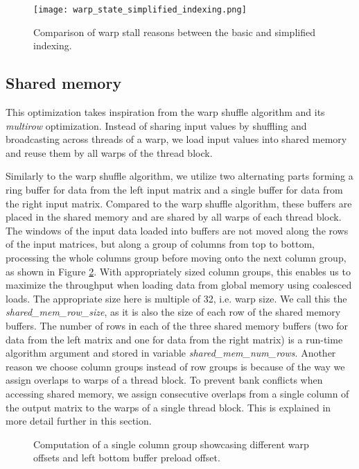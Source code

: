 \begin{figure}[ht]
	\centering
	\texttt{[image: warp\_state\_simplified\_indexing.png]}
	\caption{Comparison of warp stall reasons between the basic and simplified indexing.}
	\label{fig:warp_state_simplified_indexing}
\end{figure}

\subsection{Shared memory}
\label{sec:warp_per_shift_shared_mem}

This optimization takes inspiration from the warp shuffle algorithm and its \textit{multirow} optimization. Instead of sharing input values by shuffling and broadcasting across threads of a warp, we load input values into shared memory and reuse them by all warps of the thread block.

Similarly to the warp shuffle algorithm, we utilize two alternating parts forming a ring buffer for data from the left input matrix and a single buffer for data from the right input matrix. Compared to the warp shuffle algorithm,
these buffers are placed in the shared memory and are shared by all warps of each thread block. The windows of the input data loaded into buffers are not moved along the rows of the input matrices, but along a group of columns from top to bottom, processing the whole columns group before moving onto the next column group, as shown in Figure \ref{fig:shared_mem_buffer_iterations}. With appropriately sized column groups, this enables us to maximize the throughput when loading data from global memory using coalesced loads. The appropriate size here is multiple of 32, i.e. warp size.  We call this the \textit{shared\_mem\_row\_size}, as it is also the size of each row of the shared memory buffers. The number of rows in each of the three shared memory buffers (two for data from the left matrix and one for data from the right matrix) is a run-time algorithm argument and stored in variable \textit{shared\_mem\_num\_rows}.
Another reason we choose column groups instead of row groups is because of the way we assign overlaps to warps of a thread block. To prevent bank conflicts when accessing shared memory, we assign consecutive overlaps from a single column of the output matrix to the warps of a single thread block. This is explained in more detail further in this section.

\begin{figure}[ht]
	\centering
	\def\svgwidth{0.7\textwidth}
	\fontsize{8}{10}\selectfont
	
	\caption{Computation of a single column group showcasing different warp offsets and left bottom buffer preload offset.}
	\label{fig:shared_mem_buffer_iterations}
\end{figure}



